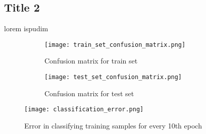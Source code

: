 \documentclass[a4paper,12pt]{article}
\begin{document}
  \subsection{Title 2}
  lorem ispudim

  \begin{figure}[ht]
    \centering
    \begin{subfigure}[b]{0.49\linewidth}
      \texttt{[image: train\_set\_confusion\_matrix.png]}
      \caption{Confusion matrix for train set}
      \label{fig:1.1a}
    \end{subfigure}
    \begin{subfigure}[b]{0.49\linewidth}
      \texttt{[image: test\_set\_confusion\_matrix.png]}
      \caption{Confusion matrix for test set}
      \label{fig:1.1b}
    \end{subfigure}
    \caption{}
  \end{figure}
  \begin{figure}[ht]
    \centering
    \texttt{[image: classification\_error.png]}
    \caption{Error in classifying training samples for every 10th epoch}
    \label{fig:1.2}
  \end{figure}
\end{document}

